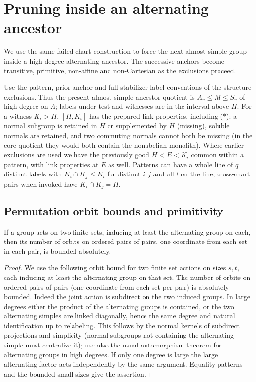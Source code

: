 \section{Pruning inside an alternating ancestor}\label{sec:alternating}

We use the same failed-chart construction to force the next almost simple group inside a high-degree alternating ancestor. The successive anchors become transitive, primitive, non-affine and non-Cartesian as the exclusions proceed.

\begin{convention}\label{c:alternating-configuration}
Use the pattern, prior-anchor and full-stabilizer-label conventions of the structure exclusions. Thus the present almost simple ancestor quotient is \(A_v\le M\le S_v\) of high degree on \(\Lambda\); labels under test and witnesses are in the interval above \(H\). For a witness \(K_i>H\), \([H,K_i]\) has the prepared link properties, including (\(*\)): a normal subgroup is retained in \(H\) or supplemented by \(H\) (missing), soluble normals are retained, and two commuting normals cannot both be missing (in the core quotient they would both contain the nonabelian monolith). Where earlier exclusions are used we have the previously good \(H<E<K_i\) common within a pattern, with link properties at \(E\) as well. Patterns can have a whole line of \(q\) distinct labels with \(K_i\cap K_j\le K_l\) for distinct \(i,j\) and all \(l\) on the line; cross-chart pairs when invoked have \(K_i\cap K_j=H\).
\end{convention}

\subsection{Permutation orbit bounds and primitivity}

\begin{lemma}\label{c:alternating-orbits}
If a group acts on two finite sets, inducing at least the alternating group on each, then its number of orbits on ordered pairs of pairs, one coordinate from each set in each pair, is bounded absolutely.
\end{lemma}

\begin{proof}
We use the following orbit bound for two finite set actions on sizes \(s,t\), each inducing at least the alternating group on that set. The number of orbits on ordered pairs of pairs (one coordinate from each set per pair) is absolutely bounded. Indeed the joint action is subdirect on the two induced groups. In large degrees either the product of the alternating groups is contained, or the two alternating simples are linked diagonally, hence the same degree and natural identification up to relabeling. This follows by the normal kernels of subdirect projections and simplicity (normal subgroups not containing the alternating simple must centralize it); use also the usual automorphism theorem for alternating groups in high degrees. If only one degree is large the large alternating factor acts independently by the same argument. Equality patterns and the bounded small sizes give the assertion.
\end{proof}

